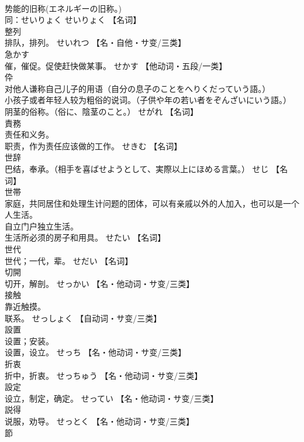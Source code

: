 \documentclass[8pt]{extreport}
\begin{document}
\begin{CJK}{UTF8}{min}
\\	势能的旧称(エネルギーの旧称。) 
\\	同：せいりょく	せいりょく		【名词】
\\	整列	
\\	排队，排列。	せいれつ		【名・自他・サ变/三类】
\\	急かす	
\\	催，催促。促使赶快做某事。	せかす		【他动词・五段/一类】
\\	伜	
\\	对他人谦称自己儿子的用语（自分の息子のことをへりくだっていう語。） 
\\	小孩子或者年轻人较为粗俗的说词。（子供や年の若い者をぞんざいにいう語。） 
\\	阴茎的俗称。（俗に、陰茎のこと。）	せがれ		【名词】
\\	責務	
\\	责任和义务。 
\\	职责，作为责任应该做的工作。	せきむ		【名词】
\\	世辞	
\\	巴结，奉承。（相手を喜ばせようとして、実際以上にほめる言葉。）	せじ		【名词】
\\	世帯	
\\	家庭，共同居住和处理生计问题的团体，可以有亲戚以外的人加入，也可以是一个人生活。 
\\	自立门户独立生活。 
\\	生活所必须的房子和用具。	せたい		【名词】
\\	世代	
\\	世代；一代，辈。	せだい		【名词】
\\	切開	
\\	切开，解剖。	せっかい		【名・他动词・サ变/三类】
\\	接触	
\\	靠近触摸。 
\\	联系。	せっしょく		【自动词・サ变/三类】
\\	設置	
\\	设置；安装。 
\\	设置，设立。	せっち		【名・他动词・サ变/三类】
\\	折衷	
\\	折中，折衷。	せっちゅう		【名・他动词・サ变/三类】
\\	設定	
\\	设立，制定，确定。	せってい		【名・他动词・サ变/三类】
\\	説得	
\\	说服，劝导。	せっとく		【名・他动词・サ变/三类】
\\	節	

\end{CJK}
\end{document}
